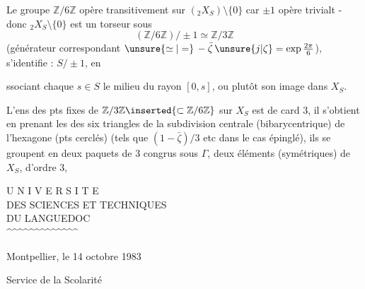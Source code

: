 Le groupe $\mathbb Z/6\mathbb Z$ opère transitivement sur $({}_2X_S)\setminus\{0\}$ car $\pm1$ opère trivialt - donc ${}_2X_S\setminus\{0\}$ est un torseur sous
\[
(\mathbb Z/6\mathbb Z)/\pm1\simeq\mathbb Z/3\mathbb Z
\]
 (générateur correspondant $\unsure{\simeq|=}\,-\bar\zeta\,\unsure{j|\zeta}=\exp\frac{2\pi}{6}$),
  s'identifie : $S/\pm1$, en
ssociant  chaque $s\in S$ le milieu du rayon $[0,s]$, ou plutôt son image dans\inserted{)} $X_S$.

L'ens des pts fixes de $\mathbb Z/3\mathbb Z\inserted{\subset\mathbb Z/6\mathbb Z}$ sur $X_S$ est de card 3, il s'obtient en prenant les  des six triangles de la subdivision centrale (bibarycentrique) de l'hexagone (pts cerclés) (tels que $(1-\bar\zeta)/3$ etc dans le cas épinglé), ils se groupent en deux paquets de 3  congrus sous $\Gamma$,  deux éléments (symétriques) de $X_S$, d'ordre 3,



\noindent\begin{minipage}[t]{0.43\textwidth}
\centering
U N I V E R S I T E\\
DES SCIENCES ET TECHNIQUES\\
DU LANGUEDOC\\
\textasciicircum\textasciicircum\textasciicircum\textasciicircum\textasciicircum\textasciicircum\textasciicircum\textasciicircum\textasciicircum\textasciicircum\textasciicircum\textasciicircum\textasciicircum
\end{minipage}\hfill
\begin{minipage}[t]{0.49\textwidth}
\raggedleft
\vspace{\baselineskip}
Montpellier, le 14 octobre 1983
\end{minipage}

Service de la Scolarité

